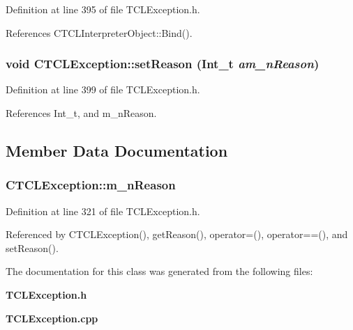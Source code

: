 Definition at line 395 of file TCLException.h.

References CTCLInterpreter\-Object::Bind().
\subsubsection{\setlength{\rightskip}{0pt plus 5cm}void CTCLException::set\-Reason ({\bf Int\_\-t} {\em am\_\-n\-Reason})\hspace{0.3cm}{\tt  [inline, protected]}}\label{classCTCLException_b1}




Definition at line 399 of file TCLException.h.

References Int\_\-t, and m\_\-n\-Reason.

\subsection{Member Data Documentation}
\subsubsection{ CTCLException::m\_\-n\-Reason\hspace{0.3cm}{\tt  [private]}}\label{classCTCLException_o0}




Definition at line 321 of file TCLException.h.

Referenced by CTCLException(), get\-Reason(), operator=(), operator==(), and set\-Reason().

The documentation for this class was generated from the following files:\begin{CompactItemize}
\item 
{\bf TCLException.h}\item 
{\bf TCLException.cpp}\end{CompactItemize}
